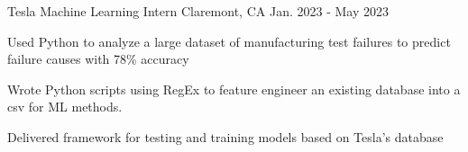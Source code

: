   \cventry
    {Tesla} %
    {Machine Learning Intern} %
    {Claremont, CA} %
    {Jan. 2023 - May 2023} %
    {
      \begin{cvitems} %
        \item {
        Used Python to analyze a large dataset of manufacturing test failures to predict failure causes with 78\% accuracy
        }
        \item{
        Wrote Python scripts using RegEx to feature engineer an existing database into a csv for ML methods.
        }
        \item{
        Delivered framework for testing and training models based on Tesla's database
        }
      \end{cvitems}
    }
